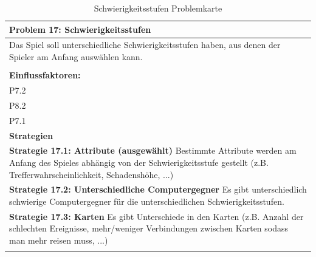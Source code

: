 \documentclass[fontsize=12pt,paper=a4,twoside]{scrartcl}
\begin{document}
\begin{table}[H]
    \centering
    \begin{tabular}{|p{15cm}|}
    \hline
          \textbf{Problem 17: Schwierigkeitsstufen}  \\ \hline
	Das Spiel soll unterschiedliche Schwierigkeitsstufen haben, aus denen der Spieler am Anfang auswählen kann. \\
         \\ \hline
          \textbf{Einflussfaktoren: } \\
	P7.2 \\
	P8.2 \\
	P7.1 \\
          \hline
          \textbf{Strategien} \\ \hline
            {}          
           \label{strategie:17.1}     
          \textbf{Strategie 17.1: Attribute (ausgewählt)} Bestimmte Attribute werden am Anfang des Spieles abhängig von der Schwierigkeitsstufe gestellt (z.B. Trefferwahrscheinlichkeit, Schadenshöhe, ...)  \\        
  {}          
           \label{strategie:17.2}              
          \textbf{Strategie 17.2: Unterschiedliche Computergegner} Es gibt unterschiedlich schwierige Computergegner für die unterschiedlichen Schwierigkeitsstufen.   \\
	 {}          
           \label{strategie:17.3}     
          \textbf{Strategie 17.3: Karten } Es gibt Unterschiede in den Karten (z.B. Anzahl der schlechten Ereignisse, mehr/weniger Verbindungen zwischen Karten sodass man mehr reisen muss, ...)  \\ 
	 \\ \hline
    \end{tabular}

    \caption{Schwierigkeitsstufen Problemkarte}
    \label{tab:ProblemKarte17}
\end{table}
\end{document}
